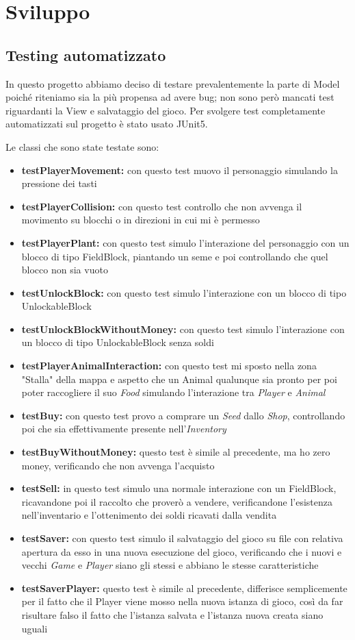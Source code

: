 \documentclass[a4paper,12pt]{report}
\begin{document}
\chapter{Sviluppo}
\section{Testing automatizzato}


In questo progetto abbiamo deciso di testare prevalentemente la parte di Model poiché riteniamo sia la più propensa ad avere bug; non sono però mancati test riguardanti la View e salvataggio del gioco.
Per svolgere test completamente automatizzati sul progetto è stato usato JUnit5.


{
Le classi che sono state testate sono:
\begin{itemize}
	\item \textbf{testPlayerMovement:} con questo test muovo il personaggio simulando la pressione dei tasti  
	\item \textbf{testPlayerCollision:} con questo test controllo che non avvenga il movimento su blocchi o in direzioni in cui mi è permesso
	\item \textbf{testPlayerPlant:} con questo test simulo l'interazione del personaggio con un blocco di tipo FieldBlock, piantando un seme e poi controllando che quel blocco non sia vuoto
	\item \textbf{testUnlockBlock:} con questo test simulo l'interazione con un blocco di tipo UnlockableBlock
	\item \textbf{testUnlockBlockWithoutMoney:} con questo test simulo l'interazione con un blocco di tipo UnlockableBlock senza soldi
	\item \textbf{testPlayerAnimalInteraction:} con questo test mi sposto nella zona "Stalla" della mappa e aspetto che un Animal qualunque sia pronto per poi poter raccogliere il suo \textit{Food} simulando l'interazione tra \textit{Player} e \textit{Animal}
	\item \textbf{testBuy:} con questo test provo a comprare un \textit{Seed} dallo \textit{Shop}, controllando poi che sia effettivamente presente nell'\textit{Inventory}
	\item \textbf{testBuyWithoutMoney:} questo test è simile al precedente, ma ho zero money, verificando che non avvenga l'acquisto
	\item \textbf{testSell:} in questo test simulo una normale interazione con un FieldBlock, ricavandone poi il raccolto che proverò a vendere, verificandone l'esistenza nell'inventario e l'ottenimento dei soldi ricavati dalla vendita
	\item \textbf{testSaver:} con questo test simulo il salvataggio del gioco su file con relativa apertura da esso in una nuova esecuzione del gioco, verificando che i nuovi e vecchi \textit{Game} e \textit{Player} siano gli stessi e abbiano le stesse caratteristiche
	\item \textbf{testSaverPlayer:} questo test è simile al precedente, differisce semplicemente per il fatto che il Player viene mosso nella nuova istanza di gioco, così da far risultare falso il fatto che l'istanza salvata e l'istanza nuova creata siano uguali	
\end{itemize}
}
\end{document}
